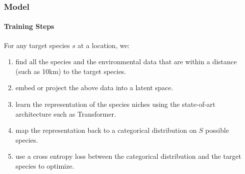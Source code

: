 \documentclass[handout]{beamer}
\begin{document}

\begin{frame}[t]
    \frametitle{Model}
    \framesubtitle{Training Steps}
    For any target species $s$ at a location, we:
    \begin{enumerate}
        \item find all the species and the environmental data that are within a distance (such as 10km) to the target species. 
        \item embed or project the above data into a latent space.
        \item learn the representation of the species niches using the state-of-art architecture such as Transformer.
        \item map the representation back to a categorical distribution on $S$ possible species.
        \item use a cross entropy loss between the categorical distribution and the target species to optimize.
    \end{enumerate}
\end{frame}
\end{document}
